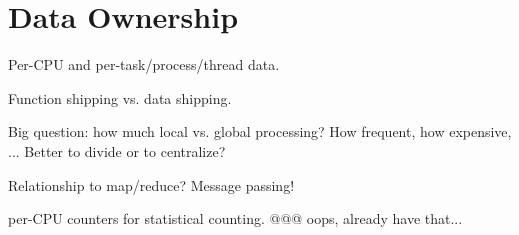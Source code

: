 
\chapter{Data Ownership}

Per-CPU and per-task/process/thread data.

Function shipping vs. data shipping.

Big question: how much local vs. global processing?  How frequent,
how expensive, ...  Better to divide or to centralize?

Relationship to map/reduce?  Message passing!

per-CPU counters for statistical counting.  @@@ oops, already have that...
